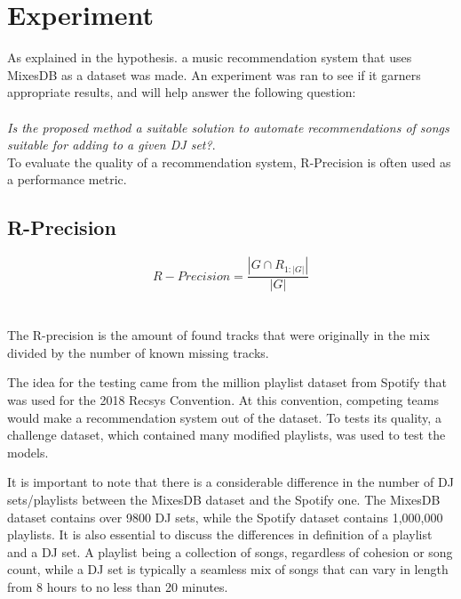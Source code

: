 
\graphicspath{{Chapter5/}}


\chapter{Experiment}


As explained in the hypothesis. a music recommendation system that uses MixesDB as a dataset was made. An experiment was ran to see if it garners appropriate results, and will help answer the following question:
\\
\\
\textit{Is the proposed method a suitable solution to automate recommendations of songs suitable for adding to a given DJ set?}.
\\

To evaluate the quality of a recommendation system, R-Precision is often used as a performance metric. 
\\

\section{R-Precision}

\begin{equation}
	R-Precision = \frac{|G\cap R_{1:|G|}|}{|G|}
\end{equation}
\\\\
The R-precision is the amount of found tracks that were originally in the mix divided by the number of known missing tracks.

The idea for the testing came from the million playlist dataset from Spotify  that was used for the 2018 Recsys Convention\citep{aicrowd_aicrowd_2023}. At this convention, competing teams would make a recommendation system out of the dataset. To tests its quality, a challenge dataset, which contained many modified playlists, was used to test the models.

It is important to note that there is a considerable difference in the number of DJ sets/playlists between the MixesDB dataset and the Spotify one. The MixesDB dataset contains over 9800 DJ sets, while the Spotify dataset contains 1,000,000 playlists. It is also essential to discuss the differences in definition of a playlist and a DJ set. A playlist being a collection of songs, regardless of cohesion or song count, while a DJ set is typically a seamless mix of songs that can vary in length from 8 hours to no less than 20 minutes.

